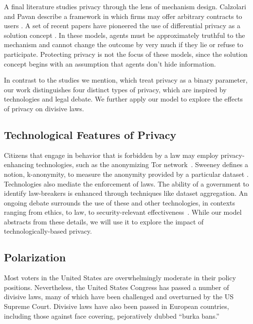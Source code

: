 A final literature studies privacy through the lens of mechanism design.  Calzolari and Pavan describe a framework in which firms may offer arbitrary contracts to users \cite{calzolari2006optimality}.   A set of recent papers have pioneered the use of differential privacy as a solution concept \cite{pai2013privacy}.  In these models, agents must be approximately truthful to the mechanism and cannot change the outcome by very much if they lie or refuse to participate.  Protecting privacy is not the focus of these models, since the solution concept begins with an assumption that agents don't hide information.

In contrast to the studies we mention, which treat privacy as a binary parameter, our work distinguishes four distinct types of privacy, which are inspired by technologies and legal debate.  We further apply our model to explore the effects of privacy on divisive laws.

\subsection{Technological Features of Privacy}

Citizens that engage in behavior that is forbidden by a law may employ privacy-enhancing technologies, such as the anonymizing Tor network~\cite{dingledine2003privacy}.  Sweeney defines a notion, k-anonymity, to measure the anonymity provided by a particular dataset \cite{sweeney2002k}. Technologies also mediate the enforcement of laws.  The ability of a government to identify law-breakers is enhanced through techniques like dataset aggregation\cite{acquisti2009predicting}.  An ongoing debate surrounds the use of these and other technologies, in contexts ranging from ethics\cite{lyon2002surveillance,diffie2010privacy}, to law\cite{landau2009,landau2013making,landau2014,Bankston14}, to security-relevant effectiveness~\cite{schneier2013oppression%
}.  While our model abstracts from these details, we will use it to explore the impact of technologically-based privacy.


\subsection{Polarization}
Most voters in the United States are overwhelmingly moderate in their policy positions\cite{layman2006party}.   Nevertheless, the United States Congress has passed a number of divisive laws, many of which have been challenged and overturned by the US Supreme Court.  Divisive laws have also been passed in European countries, including those against face covering, pejoratively dubbed ``burka bans.''


